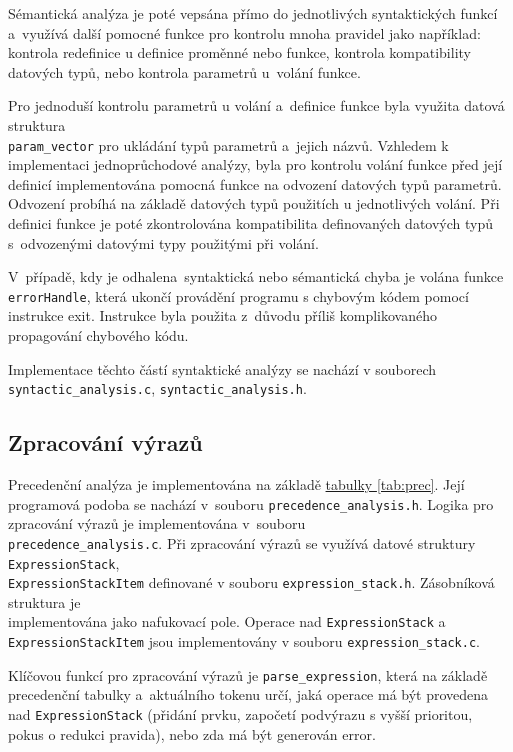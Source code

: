 \documentclass[11pt]{article}
\begin{document}
Sémantická analýza je poté vepsána přímo do jednotlivých syntaktických funkcí a~využívá
další pomocné funkce pro kontrolu mnoha pravidel jako například: kontrola redefinice u definice proměnné nebo funkce,
kontrola kompatibility datových typů, nebo kontrola parametrů u~volání funkce. 

Pro jednoduší kontrolu parametrů u volání a~definice funkce byla využita datová struktura \\ \texttt{param\_vector}
pro ukládání typů parametrů a~jejich názvů. Vzhledem k implementaci jednoprůchodové analýzy, byla pro kontrolu volání
funkce před její definicí implementována pomocná funkce na odvození datových typů parametrů.
Odvození probíhá na základě datových typů použitích u jednotlivých volání.
Při definici funkce je poté zkontrolována kompatibilita definovaných datových typů s~odvozenými datovými typy použitými při volání. 

V~případě, kdy je odhalena~syntaktická nebo sémantická chyba je volána funkce \texttt{errorHandle},
která ukončí provádění programu s chybovým kódem pomocí instrukce exit.
Instrukce byla použita z~důvodu příliš komplikovaného propagování chybového kódu.

Implementace těchto částí syntaktické analýzy se nachází v souborech \texttt{syntactic\_analysis.c}, \texttt{syntactic\_analysis.h}.

\subsection{Zpracování výrazů}
Precedenční analýza je implementována na základě \href{tab:prec}{tabulky \ref{tab:prec}}.
Její programová podoba se nachází v~souboru \texttt{precedence\_analysis.h}.
Logika pro zpracování výrazů je implementována v~souboru \\
\texttt{precedence\_analysis.c}.
Při zpracování výrazů se využívá datové struktury \texttt{ExpressionStack},\\ \texttt{ExpressionStackItem} definované v souboru
\texttt{expression\_stack.h}. Zásobníková struktura je\\ implementována jako nafukovací pole.
Operace nad \texttt{ExpressionStack} a \texttt{ExpressionStackItem} jsou implementovány v souboru \texttt{expression\_stack.c}.

Klíčovou funkcí pro zpracování výrazů je \texttt{parse\_expression}, která na základě precedenční tabulky a~aktuálního tokenu určí, jaká operace
má být provedena nad \texttt{ExpressionStack} (přidání prvku, započetí podvýrazu s vyšší prioritou, pokus o redukci pravida), nebo zda má být generován error.
\end{document}

